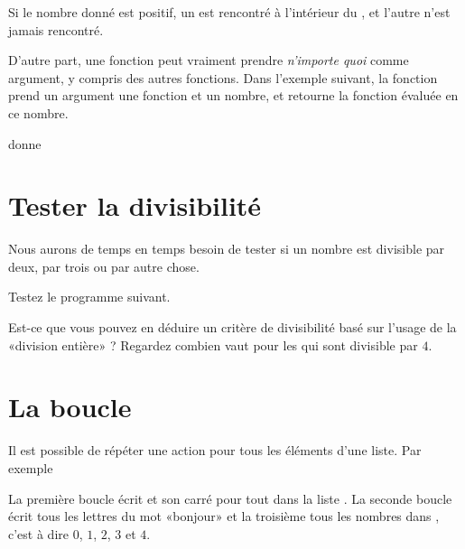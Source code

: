 

Si le nombre donné est positif, un  est rencontré à l'intérieur du , et l'autre  n'est jamais rencontré.

D'autre part, une fonction peut vraiment prendre \emph{n'importe quoi} comme argument, y compris des autres fonctions. Dans l'exemple suivant, la fonction  prend un argument une fonction et un nombre, et retourne la fonction évaluée en ce nombre.



donne



\section{Tester la divisibilité}

Nous aurons de temps en temps besoin de tester si un nombre est divisible par deux, par trois ou par autre chose.

Testez le programme suivant.



Est-ce que vous pouvez en déduire un critère de divisibilité basé sur l'usage de la «division entière» \info{\%} ? Regardez combien vaut  pour les  qui sont divisible par \( 4\).


\section{La boucle }

Il est possible de répéter une action pour tous les éléments d'une liste. Par exemple



La première boucle écrit  et son carré pour tout  dans la liste \info{[1,5,10,2]}. La seconde boucle écrit tous les lettres du mot «bonjour» et la troisième tous les nombres dans , c'est à dire \( 0\), \( 1\), \( 2\), \( 3\) et \( 4\).

